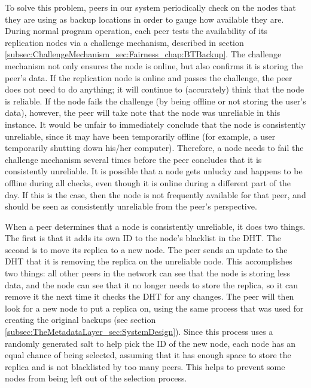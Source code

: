 \documentclass[12pt]{report}
\begin{document}
To solve this problem, peers in our system periodically check on the nodes that they are using as backup locations in order to gauge how available they are. During normal program operation, each peer tests the availability of its replication nodes via a challenge mechanism, described in section \ref{subsec:ChallengeMechanism_sec:Fairness_chap:BTBackup}. The challenge mechanism not only ensures the node is online, but also confirms it is storing the peer's data. If the replication node is online and passes the challenge, the peer does not need to do anything; it will continue to (accurately) think that the node is reliable. If the node fails the challenge (by being offline or not storing the user's data), however, the peer will take note that the node was unreliable in this instance. It would be unfair to immediately conclude that the node is consistently unreliable, since it may have been temporarily offline (for example, a user temporarily shutting down his/her computer). Therefore, a node needs to fail the challenge mechanism several times before the peer concludes that it is consistently unreliable. It is possible that a node gets unlucky and happens to be offline during all checks, even though it is online during a different part of the day. If this is the case, then the node is not frequently available for that peer, and should be seen as consistently unreliable from the peer's perspective.

When a peer determines that a node is consistently unreliable, it does two things. The first is that it adds its own ID to the node's blacklist in the DHT. The second is to move its replica to a new node. The peer sends an update to the DHT that it is removing the replica on the unreliable node. This accomplishes two things: all other peers in the network can see that the node is storing less data, and the node can see that it no longer needs to store the replica, so it can remove it the next time it checks the DHT for any changes. The peer will then look for a new node to put a replica on, using the same process that was used for creating the original backups (see section \ref{subsec:TheMetadataLayer_sec:SystemDesign}). Since this process uses a randomly generated salt to help pick the ID of the new node, each node has an equal chance of being selected, assuming that it has enough space to store the replica and is not blacklisted by too many peers. This helps to prevent some nodes from being left out of the selection process. %
\end{document}
